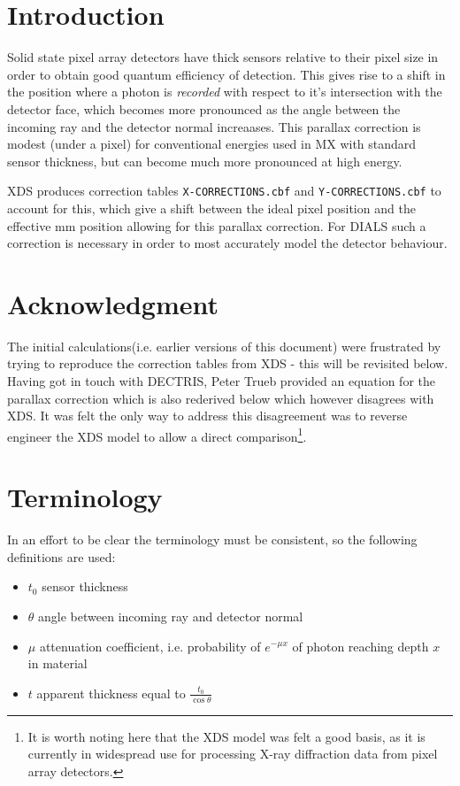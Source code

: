 \documentclass{article}
\begin{document}
\noindent
\section{Introduction}

Solid state pixel array detectors have thick sensors relative to their
pixel size in order to obtain good quantum efficiency of
detection. This gives rise to a shift in the position where a photon
is \emph{recorded} with respect to it's intersection with the detector
face, which becomes more pronounced as the angle between the incoming
ray and the detector normal increaases. This parallax correction is
modest (under a pixel) for conventional energies used in MX with
standard sensor thickness, but can become much more pronounced at high
energy.

XDS produces correction tables \verb|X-CORRECTIONS.cbf| and
\verb|Y-CORRECTIONS.cbf| to account for this, which give a shift
between the ideal pixel position and the effective mm position
allowing for this parallax correction. For DIALS such a correction is
necessary in order to most accurately model the detector behaviour.

\section{Acknowledgment}

The initial calculations(i.e. earlier versions of this document) were
frustrated by trying to reproduce the correction tables from XDS -
this will be revisited below. Having got in touch with DECTRIS, Peter
Trueb provided an equation for the parallax correction which is also
rederived below which however disagrees with XDS. It was felt the only
way to address this disagreement was to reverse engineer the XDS model
to allow a direct comparison\footnote{It is worth noting here that
  the XDS model was felt a good basis, as it is currently in
  widespread use for processing X-ray diffraction data from pixel
  array detectors.}.

\section{Terminology}

In an effort to be clear the terminology must be consistent, so the
following definitions are used:

\begin{itemize}
\item{$t_0$ sensor thickness}
\item{$\theta$ angle between incoming ray and detector normal}
\item{$\mu$ attenuation coefficient, i.e. probability of $e^{-\mu x}$ of photon reaching depth $x$ in material}
\item{$t$ apparent thickness equal to $\frac{t_0}{\cos \theta}$}
\end{itemize}
\end{document}
